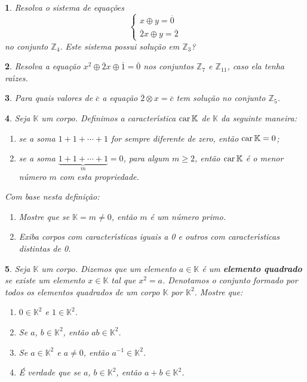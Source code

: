 \documentclass[12pt]{exam}
\newtheorem{exercicio}{}
\newcommand{\integer}{\mathbb{Z}}
\newcommand{\cp}[1]{\mathbb{#1}}
\newcommand{\ch}{\mbox{\textrm{car\,}}\nobreak}
\begin{document}
\begin{exercicio}
  Resolva o sistema de equa\c{c}\~oes
  \[
    \begin{cases}
      x \oplus y = \overline{0}\\
      \overline{2}x \oplus y = \overline{2}
    \end{cases}
  \]
  no conjunto $\integer_4$. Este sistema possui solu\c{c}\~ao em $\integer_3$?
\end{exercicio}

\begin{exercicio}
  Resolva a equa\c{c}\~ao $x^2 \oplus \overline{2}x \oplus \overline{1} = \overline{0}$ nos conjuntos $\integer_7$ e $\integer_{11}$, caso ela tenha ra{\'\i}zes.
\end{exercicio}

\begin{exercicio}
  Para quais valores de $\overline{c}$ a equa\c{c}\~ao $\overline{2}\otimes x = \overline{c}$ tem solu\c{c}\~ao no conjunto $\integer_5$.
\end{exercicio}

\begin{exercicio}
Seja $\mathbb{K}$ um corpo. Definimos a caracter{\'\i}stica \textbf{$\ch \mathbb{K}$} de $\mathbb{K}$ da seguinte maneira:
\begin{enumerate}[label=({\roman*})]
  \item se a soma $1 + 1 + \cdots + 1$ for sempre diferente de zero, ent\~ao \textbf{$\ch \mathbb{K} = 0$};
  \item se a soma $\underbrace{1 + 1 + \cdots + 1}_{m} = 0$, para algum $m \ge 2$, ent\~ao \textbf{$\ch \mathbb{K}$} \'e o menor n\'umero $m$ com esta propriedade.
\end{enumerate}
Com base nesta defini\c{c}\~ao:
\begin{enumerate}[label={\alph*})]
  \item Mostre que se $\mathbb{K} = m \ne 0$, ent\~ao $m$ \'e um n\'umero primo.
  \item Exiba corpos com caracter{\'\i}sticas iguais a 0 e outros com caracter{\'\i}sticas distintas de 0.
\end{enumerate}
\end{exercicio}

\begin{exercicio}
  Seja $\cp{K}$ um corpo. Dizemos que um elemento $a \in \cp{K}$ \'e um \textbf{elemento quadrado} se existe um elemento $x \in \cp{K}$ tal que $x^2 = a$. Denotamos o conjunto formado por todos os elementos quadrados de um corpo $\cp{K}$ por $\cp{K}^2$. Mostre que:
  \begin{enumerate}[label={\alph*})]
    \item $0 \in \cp{K}^2$ e $1 \in \cp{K}^2$.
    \item Se $a$, $b \in \cp{K}^2$, ent\~ao $ab \in \cp{K}^2$.
    \item Se $a \in \cp{K}^2$ e $a \ne 0$, ent\~ao $a^{-1} \in \cp{K}^2$.
    \item \'E verdade que se $a$, $b \in \cp{K}^2$, ent\~ao $a + b \in \cp{K}^2$.
  \end{enumerate}
\end{exercicio}
\end{document}

